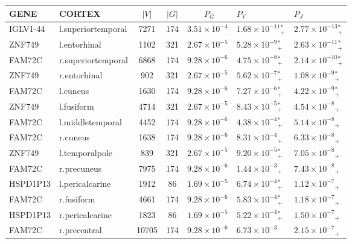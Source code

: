 \begin{tabular}{llcclll}
  \hline
GENE & CORTEX & $|V|$ & $|G|$ & $\qquad P_G$ & \qquad $P_V$ & \qquad $P_J$ \\ 
  \hline
IGLV1-44 & l.superiortemporal & 7271 &  174 & $3.51 \times {10^{-4}}$ & $1.68 \times {10^{-11}}{_+^*}$ & $2.77 \times {10^{-13}}{_+^*}$ \\ 
  ZNF749 & l.entorhinal & 1102 &  321 & $2.67 \times {10^{-5}}$ & $5.28 \times {10^{-9}}{_+^*}$ & $2.63 \times {10^{-11}}{_+^*}$ \\ 
  FAM72C & r.superiortemporal & 6868 &  174 & $9.28 \times {10^{-6}}$ & $4.75 \times {10^{-8}}{_+^*}$ & $2.14 \times {10^{-10}}{_+^*}$ \\ 
  ZNF749 & r.entorhinal &  902 &  321 & $2.67 \times {10^{-5}}$ & $5.62 \times {10^{-7}}{_+^*}$ & $1.08 \times {10^{-9}}{_+^*}$ \\ 
  FAM72C & l.cuneus & 1630 &  174 & $9.28 \times {10^{-6}}$ & $7.27 \times {10^{-6}}{_+^*}$ & $4.22 \times {10^{-9}}{_+^*}$ \\ 
  ZNF749 & l.fusiform & 4714 &  321 & $2.67 \times {10^{-5}}$ & $8.43 \times {10^{-5}}{_+^*}$ & $4.54 \times {10^{-8}}{_+}$ \\ 
  FAM72C & l.middletemporal & 4452 &  174 & $9.28 \times {10^{-6}}$ & $4.38 \times {10^{-4}}{_+^*}$ & $5.14 \times {10^{-8}}{_+}$ \\ 
  FAM72C & r.cuneus & 1638 &  174 & $9.28 \times {10^{-6}}$ & $8.31 \times {10^{-4}}{_+}$ & $6.33 \times {10^{-8}}{_+}$ \\ 
  ZNF749 & l.temporalpole &  839 &  321 & $2.67 \times {10^{-5}}$ & $9.20 \times {10^{-5}}{_+^*}$ & $7.05 \times {10^{-8}}{_+}$ \\ 
  FAM72C & r.precuneus & 7975 &  174 & $9.28 \times {10^{-6}}$ & $1.44 \times {10^{-3}}{_+}$ & $7.43 \times {10^{-8}}{_+}$ \\ 
  HSPD1P13 & l.pericalcarine & 1912 &   86 & $1.69 \times {10^{-5}}$ & $6.74 \times {10^{-4}}{_+^*}$ & $1.12 \times {10^{-7}}{_+}$ \\ 
  FAM72C & r.fusiform & 4661 &  174 & $9.28 \times {10^{-6}}$ & $5.83 \times {10^{-4}}{_+^*}$ & $1.18 \times {10^{-7}}{_+}$ \\ 
  HSPD1P13 & r.pericalcarine & 1823 &   86 & $1.69 \times {10^{-5}}$ & $5.22 \times {10^{-4}}{_+^*}$ & $1.50 \times {10^{-7}}{_+}$ \\ 
  FAM72C & r.precentral & 10705 &  174 & $9.28 \times {10^{-6}}$ & $6.73 \times {10^{-3}}$ & $2.15 \times {10^{-7}}{_+}$ \\ 

\end{tabular}
